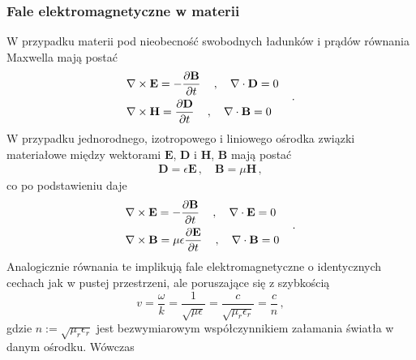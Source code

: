 \documentclass[../main.tex]{subfiles}
\begin{document}
\subsubsection{Fale elektromagnetyczne w materii}
W przypadku materii pod nieobecność swobodnych ładunków i prądów równania Maxwella mają postać
\begin{equation*}
    \begin{split}
        &\nabla\times\mathbf{E}=-\pdv{\mathbf{B}}{t}\quad\,,\quad\nabla\cdot\mathbf{D}=0\\
        &\nabla\times\mathbf{H}=\pdv{\mathbf{D}}{t}\quad\,,\quad\nabla\cdot\mathbf{B}=0
    \end{split}\quad\,.
\end{equation*}
W przypadku jednorodnego, izotropowego i liniowego ośrodka związki materiałowe między wektorami \(\mathbf{E}\), \(\mathbf{D}\) i \(\mathbf{H}\), \(\mathbf{B}\) mają postać
\begin{equation*}
    \begin{split}
        \mathbf{D}=\epsilon\mathbf{E}\,,\quad\mathbf{B}=\mu\mathbf{H}\,,
    \end{split}
\end{equation*}
co po podstawieniu daje
\begin{equation*}
    \begin{split}
        &\nabla\times\mathbf{E}=-\pdv{\mathbf{B}}{t}\quad\,,\quad\nabla\cdot\mathbf{E}=0\\
        &\nabla\times\mathbf{B}=\mu\epsilon\pdv{\mathbf{E}}{t}\quad\,,\quad\nabla\cdot\mathbf{B}=0
    \end{split}\quad\,.
\end{equation*}
Analogicznie równania te implikują fale elektromagnetyczne o identycznych cechach jak w pustej przestrzeni, ale poruszające się z szybkością
\begin{equation*}
    v=\frac{\omega}{k}=\frac{1}{\sqrt{\mu\epsilon}}=\frac{c}{\sqrt{\mu_r\epsilon_r}}=\frac{c}{n}\,,
\end{equation*}
gdzie \(n:=\sqrt{\mu_r\epsilon_r}\) jest bezwymiarowym współczynnikiem załamania światła w danym ośrodku. Wówczas\\
\begin{center}
    \noindent{}
\end{center}
\end{document}
